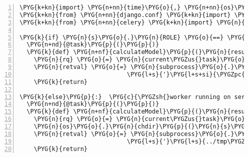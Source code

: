 \begin{Verbatim}[commandchars=\\\{\},numbers=left,stepnumber=1,codes={\catcode`\$=3\catcode`\^=7\catcode`\_=8}]
\PYG{k+kn}{import} \PYG{n+nn}{time}\PYG{o}{,} \PYG{n+nn}{os}\PYG{o}{,} \PYG{n+nn}{subprocess}
\PYG{k+kn}{from} \PYG{n+nn}{django.conf} \PYG{k+kn}{import} \PYG{n}{settings} \PYG{k}{as} \PYG{n}{s}
\PYG{k+kn}{from} \PYG{n+nn}{celery} \PYG{k+kn}{import} \PYG{n}{task}\PYG{p}{,} \PYG{n}{current\PYGZus{}task}

\PYG{k}{if} \PYG{n}{s}\PYG{o}{.}\PYG{n}{ROLE} \PYG{o}{==} \PYG{l+s}{"}\PYG{l+s}{production\PYGZus{}worker}\PYG{l+s}{"}\PYG{p}{:} \PYG{c}{\PYGZsh{}standalone worker?}
  \PYG{n+nd}{@task}\PYG{p}{(}\PYG{p}{)}
  \PYG{k}{def} \PYG{n+nf}{calculateModel}\PYG{p}{(}\PYG{n}{result\PYGZus{}id}\PYG{p}{)}\PYG{p}{:}
    \PYG{n}{rq} \PYG{o}{=} \PYG{n}{current\PYGZus{}task}\PYG{o}{.}\PYG{n}{request}
    \PYG{n}{retval} \PYG{o}{=} \PYG{n}{subprocess}\PYG{o}{.}\PYG{n}{call}\PYG{p}{(}\PYG{p}{[}\PYG{l+s}{'}\PYG{l+s}{../run\PYGZus{}worker\PYGZus{}glass}\PYG{l+s}{'}\PYG{p}{,}
                              \PYG{l+s}{'}\PYG{l+s+si}{\PYGZpc{}06i}\PYG{l+s}{'} \PYG{o}{\PYGZpc{}} \PYG{n}{result\PYGZus{}id}\PYG{p}{]}\PYG{p}{)}
    \PYG{k}{return}
    
\PYG{k}{else}\PYG{p}{:}  \PYG{c}{\PYGZsh{}worker running on server machine}
  \PYG{n+nd}{@task}\PYG{p}{(}\PYG{p}{)}
  \PYG{k}{def} \PYG{n+nf}{calculateModel}\PYG{p}{(}\PYG{n}{result\PYGZus{}id}\PYG{p}{)}\PYG{p}{:}
    \PYG{n}{rq} \PYG{o}{=} \PYG{n}{current\PYGZus{}task}\PYG{o}{.}\PYG{n}{request}
    \PYG{n}{os}\PYG{o}{.}\PYG{n}{chdir}\PYG{p}{(}\PYG{n}{s}\PYG{o}{.}\PYG{n}{WORKER\PYGZus{}DIR\PYGZus{}FULL}\PYG{p}{)}
    \PYG{n}{retval} \PYG{o}{=} \PYG{n}{subprocess}\PYG{o}{.}\PYG{n}{call}\PYG{p}{(}\PYG{p}{[}\PYG{l+s}{'}\PYG{l+s+si}{\PYGZpc{}s}\PYG{l+s}{/run\PYGZus{}glass}\PYG{l+s}{'} \PYG{o}{\PYGZpc{}} \PYG{n}{s}\PYG{o}{.}\PYG{n}{WORKER\PYGZus{}DIR\PYGZus{}FULL}\PYG{p}{,}
                              \PYG{l+s}{'}\PYG{l+s}{../tmp\PYGZus{}media/}\PYG{l+s+si}{\PYGZpc{}06i}\PYG{l+s}{/cfg.gls}\PYG{l+s}{'} \PYG{o}{\PYGZpc{}} \PYG{n}{result\PYGZus{}id}\PYG{p}{]}\PYG{p}{)}
    \PYG{k}{return}
\end{Verbatim}
